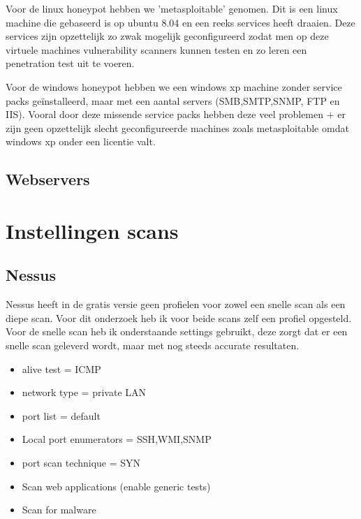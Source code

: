Voor de linux honeypot hebben we 'metasploitable' genomen. Dit is een linux machine die gebaseerd is op ubuntu 8.04 en een reeks services heeft draaien. Deze services zijn opzettelijk zo zwak mogelijk geconfigureerd zodat men op deze virtuele machines vulnerability scanners kunnen testen en zo leren een penetration test uit te voeren.

Voor de windows honeypot hebben we een windows xp machine zonder service packs geïnstalleerd, maar met een aantal servers (SMB,SMTP,SNMP, FTP en IIS). Vooral door deze missende service packs hebben deze veel problemen + er zijn geen opzettelijk slecht geconfigureerde machines zoals metasploitable omdat windows xp onder een licentie valt. 

\subsection{Webservers}



\section{Instellingen scans}

\subsection{Nessus}


Nessus heeft in de gratis versie geen profielen voor zowel een snelle scan als een diepe scan. Voor dit onderzoek heb ik voor beide scans zelf een profiel opgesteld. Voor de snelle scan heb ik onderstaande settings gebruikt, deze zorgt dat er een snelle scan geleverd wordt, maar met nog steeds accurate resultaten.

\begin{itemize}
\item alive test = ICMP
\item network type = private LAN
\item port list = default
\item Local port enumerators = SSH,WMI,SNMP
\item port scan technique = SYN
\item Scan web applications (enable generic tests)
\item Scan for malware
\end{itemize}

